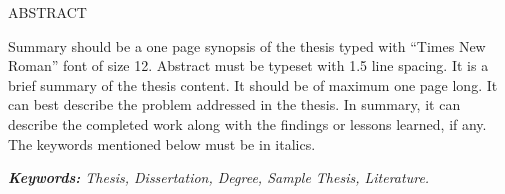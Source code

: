 \centering
\begin{center}
	\Large{ABSTRACT}	
\end{center}
\vspace{1em}
\normalsize
 
\begin{flushleft}
\justifying	
Summary should be a one page synopsis of the thesis typed with “Times New Roman” font of size 12. Abstract must be typeset with 1.5 line spacing. It is a brief summary of the thesis content. It should be of maximum one page long. It can best describe the problem addressed in the thesis. In summary, it can describe the completed work along with the findings or lessons learned, if any. The keywords mentioned below must be in italics. \par
\noindent \textit{\textbf{Keywords:} Thesis, Dissertation, Degree, Sample Thesis, Literature.}
\end{flushleft}
\pagebreak
